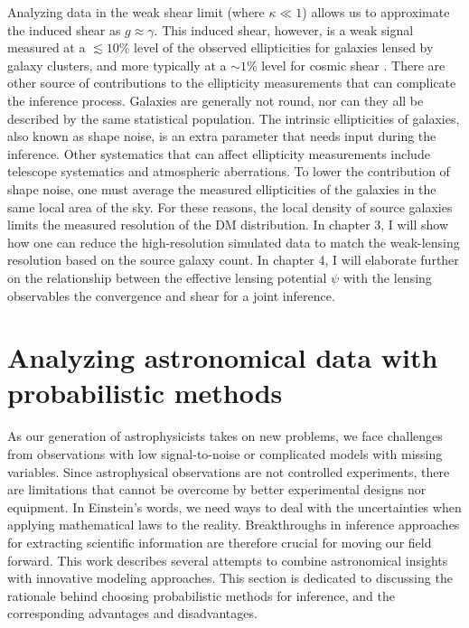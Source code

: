 Analyzing data in the weak shear limit
(where $\kappa \ll 1$) allows us to approximate the induced shear as $g \approx \gamma$.
This induced shear, however, is a weak signal measured at a $\lesssim 10\%$ 
level of the observed ellipticities for galaxies lensed by galaxy clusters, and
more typically at a $\sim 1\%$ level for cosmic shear \citep{LSSTScienceCollaboration2009}.  
There are other source of contributions to the ellipticity measurements that 
can complicate the inference process. 
Galaxies are generally not round, nor can they all be described by the same 
statistical population. The intrinsic ellipticities of galaxies, also
known as shape noise, is an extra parameter that needs input during the inference.  
Other systematics that can affect ellipticity measurements include 
telescope systematics and atmospheric aberrations.
  To lower the contribution of shape noise,  
one must average the measured ellipticities of the galaxies in the 
same local area of the sky. For these reasons, the local density of source
galaxies limits the measured resolution of the DM
distribution. In chapter 3, I will show how one can
reduce the high-resolution simulated data to match
the weak-lensing resolution based on the source galaxy count.  
In chapter 4, I will elaborate further on the relationship between the 
effective lensing potential $\psi$ with the lensing observables the convergence
and shear for a joint inference.  


\section{Analyzing astronomical data with probabilistic methods}
As our generation of astrophysicists takes on new problems,
we face challenges from observations with 
low signal-to-noise or complicated models with missing variables.
Since astrophysical observations are not controlled experiments, there are limitations 
that cannot be overcome by better experimental designs nor equipment. In
Einstein's words, we need ways to deal with the uncertainties 
when applying mathematical laws to the reality. Breakthroughs in inference 
approaches for extracting scientific information are
therefore crucial for moving our field forward. 
This work describes several attempts to combine astronomical insights
with innovative modeling approaches. This section is dedicated to 
discussing the rationale behind choosing
probabilistic methods for inference, and the corresponding advantages and
disadvantages.

